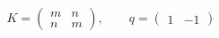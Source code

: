\begin{equation}
\begin{array}{l}
{K}=\left(\begin{array}{ll}
m&n\\
n&m\end{array}\right), \qquad
q=\left(\begin{array}{ll}
1&-1\end{array}\right)
\end{array}
\end{equation}

